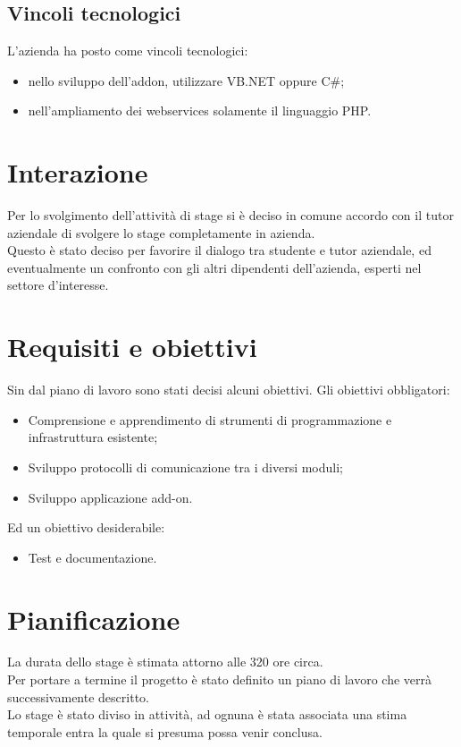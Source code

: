 \subsection{Vincoli tecnologici}
L'azienda ha posto come vincoli tecnologici:
\begin{itemize}
	\item nello sviluppo dell'addon, utilizzare VB.NET oppure C\#;
	\item nell'ampliamento dei webservices solamente il linguaggio PHP.
\end{itemize}
\section{Interazione}
Per lo svolgimento dell'attività di stage si è deciso in comune accordo con il tutor aziendale di svolgere lo stage completamente in azienda.\\
Questo è stato deciso per favorire il dialogo tra studente e tutor aziendale, ed eventualmente un confronto con gli altri dipendenti dell'azienda, esperti nel settore d'interesse.
\section{Requisiti e obiettivi}
Sin dal piano di lavoro sono stati decisi alcuni obiettivi.
Gli obiettivi obbligatori:
\begin{itemize}
	\item Comprensione e apprendimento di strumenti di programmazione e infrastruttura esistente;
	\item Sviluppo protocolli di comunicazione tra i diversi moduli;
	\item Sviluppo applicazione add-on.
\end{itemize}
Ed un obiettivo desiderabile:
\begin{itemize}
	\item Test e documentazione.
\end{itemize}

\section{Pianificazione}
La durata dello stage è stimata attorno alle 320 ore circa.\\
Per portare a termine il progetto è stato definito un piano di lavoro che verrà successivamente descritto.\\
Lo stage è stato diviso in attività, ad ognuna è stata associata una stima temporale entra la quale si presuma possa venir conclusa.
